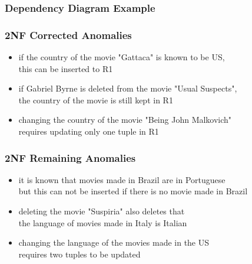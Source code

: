 \documentclass[dvipsnames]{beamer}
\begin{document}
\begin{frame}
  \frametitle{Dependency Diagram Example}

  \begin{example}
    \begin{center}
    \end{center}
  \end{example}
\end{frame}

\begin{frame}
  \frametitle{2NF Corrected Anomalies}

  \begin{example}
    \begin{itemize}
      \item if the country of the movie "Gattaca" is known to be US,\\
	this can be inserted to R1

      \pause
      \item if Gabriel Byrne is deleted from the movie "Usual Suspects",\\
	the country of the movie is still kept in R1

      \pause
      \item changing the country of the movie "Being John Malkovich"\\
	requires updating only one tuple in R1
    \end{itemize}
  \end{example}
\end{frame}

\begin{frame}
  \frametitle{2NF Remaining Anomalies}

  \begin{example}
    \begin{itemize}
      \item it is known that movies made in Brazil are in Portuguese\\
	but this can not be inserted if there is no movie made in Brazil

      \pause
      \item deleting the movie "Suspiria" also deletes that\\
        the language of movies made in Italy is Italian

      \pause
      \item changing the language of the movies made in the US\\
	requires two tuples to be updated
    \end{itemize}
  \end{example}
\end{frame}
\end{document}
